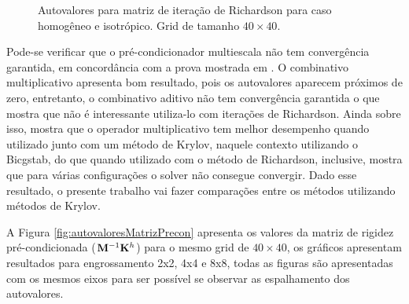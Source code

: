 \begin{figure}[h]
\qquad
{}
\caption{Autovalores para matriz de iteração de Richardson para caso homogêneo e isotrópico. Grid de tamanho $40\times40$. }\label{fig:autovaloresRichard}
\end{figure}



Pode-se verificar que o pré-condicionador multiescala não tem convergência garantida, em concordância com a prova mostrada em \cite{zhouiterativo}. O combinativo multiplicativo apresenta bom resultado, pois os autovalores aparecem próximos de zero, entretanto, o combinativo aditivo não tem convergência garantida o que mostra que não é interessante utiliza-lo com iterações de Richardson. Ainda sobre isso, \cite{casteletto} mostra que o operador multiplicativo tem melhor desempenho quando utilizado junto com um método de Krylov, naquele contexto utilizando o Bicgstab, do que quando utilizado com o método de Richardson, inclusive, mostra que para várias configurações o solver não consegue convergir. Dado esse resultado, o presente trabalho vai fazer comparações entre os métodos utilizando métodos de Krylov. 

A Figura \ref{fig:autovaloresMatrizPrecon} apresenta os valores da matriz de rigidez pré-condicionada ($\mathbf{M}^{-1} \mathbf{K}^h$) para o mesmo grid de $40 \times 40$, os gráficos apresentam  resultados para engrossamento 2x2, 4x4 e 8x8, todas as figuras são apresentadas com os mesmos eixos para ser possível se observar as espalhamento dos autovalores.

